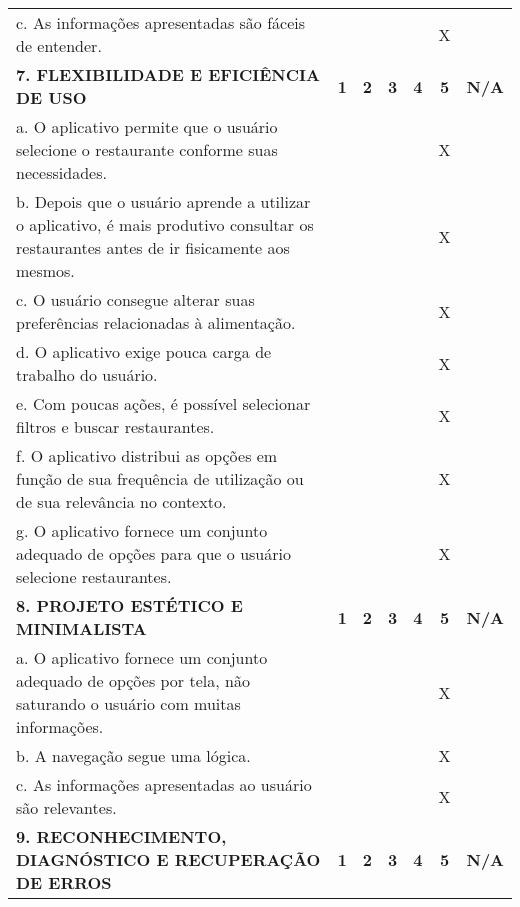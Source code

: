 \documentclass[portuguese,oneside]{tcc}
\begin{document}
\begin{center}
\begin{longtabu}{|L{25em}|c|c|c|c|c|c|}
																												c. As informações apresentadas são fáceis de entender. & & & & & X & \\ 
																												\textbf{7. FLEXIBILIDADE E EFICIÊNCIA DE USO} & \textbf{1} & \textbf{2} & \textbf{3} & \textbf{4} & \textbf{5} & \textbf{N/A} \\ 
																												a. O aplicativo permite que o usuário selecione o restaurante conforme suas necessidades. & & & & & X & \\ 
																												b. Depois que o usuário aprende a utilizar o aplicativo, é mais produtivo consultar os restaurantes antes de ir fisicamente aos mesmos. & & & & & X & \\ 
																												c. O usuário consegue alterar suas preferências relacionadas à alimentação. & & & & & X & \\ 
																												d. O aplicativo exige pouca carga de trabalho do usuário. & & & & & X & \\ 
																												e. Com poucas ações, é possível selecionar filtros e buscar restaurantes. & & & & & X & \\ 
																												f. O aplicativo distribui as opções em função de sua frequência de utilização ou de sua relevância no contexto.	& & & & & X & \\ 
																												g. O aplicativo fornece um conjunto adequado de opções para que o usuário selecione restaurantes. & & & & & X & \\ 
																												\textbf{8. PROJETO ESTÉTICO E MINIMALISTA} & \textbf{1} & \textbf{2} & \textbf{3} & \textbf{4} & \textbf{5} & \textbf{N/A} \\ 
																												a. O aplicativo fornece um conjunto adequado de opções por tela, não saturando o usuário com muitas informações. & & & & & X & \\ 
																												b. A navegação segue uma lógica. & & & & & X & \\ 
																												c. As informações apresentadas ao usuário são relevantes. & & & & & X & \\ 
																												\textbf{9. RECONHECIMENTO, DIAGNÓSTICO E RECUPERAÇÃO DE ERROS} & \textbf{1} & \textbf{2} & \textbf{3} & \textbf{4} & \textbf{5} & \textbf{N/A} \\ 

\end{longtabu}
\end{center}
\end{document}
